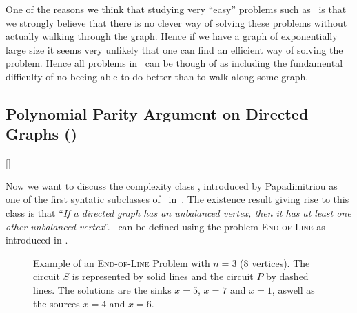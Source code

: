 One of the reasons we think that studying very ``easy'' problems such as \PLS\ is that we strongly believe that there is no clever way of solving these
problems
without actually walking through the graph.
Hence if we have a graph of exponentially large size it seems very unlikely that one can find an efficient way of solving the problem.
Hence all problems in \PLS\ can be though of as including the fundamental difficulty of no beeing able to do better than to walk along some graph.

\subsection{Polynomial Parity Argument on Directed Graphs (\PPAD)}[\PPAD]

Now we want to discuss the complexity class \PPAD, introduced by Papadimitriou as one of the first syntatic subclasses of \TFNP\
in~.
The existence result giving rise to this class is that ``\textit{If a directed graph has an unbalanced vertex, then it has at least one other unbalanced
    vertex}''.
\PPAD\ can be defined using the problem \textsc{End-of-Line} as introduced in .


\begin{figure}[ht]
    \centering
    \caption[Example of an \textsc{End-of-Line} Problem]{Example of an \textsc{End-of-Line} Problem with $n=3$ (8 vertices).
        The circuit $S$ is represented by solid lines and the circuit $P$ by dashed lines.
        The solutions are the sinks $x=5$, $x=7$ and $x=1$, aswell as the sources $x=4$ and $x=6$.}
    \label{fig:ppad_example}
\end{figure}

